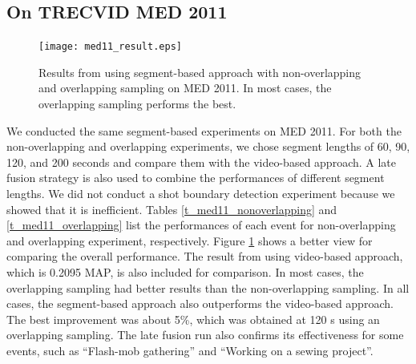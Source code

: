 \subsection{On TRECVID MED 2011}

\begin{figure}
	\centering
	\texttt{[image: med11\_result.eps]}
	\caption{Results from using segment-based approach with non-overlapping and overlapping sampling on MED 2011. In most cases, the overlapping sampling performs the best.}
	\label{f_med11_result}
\end{figure}

We conducted the same segment-based experiments on MED 2011. For both the non-overlapping and overlapping experiments, we chose segment lengths of 60, 90, 120, and 200 seconds and compare them with the video-based approach. A late fusion strategy is also used to combine the performances of different segment lengths. We did not conduct a shot boundary detection experiment because we showed that it is inefficient. Tables \ref{t_med11_nonoverlapping} and \ref{t_med11_overlapping} list the performances of each event for non-overlapping and overlapping experiment, respectively. Figure \ref{f_med11_result} shows a better view for comparing the overall performance. The result from using video-based approach, which is 0.2095 MAP, is also included for comparison. In most cases, the overlapping sampling had better results than the non-overlapping sampling. In all cases, the segment-based approach also outperforms the video-based approach. The best improvement was about 5\%, which was obtained at 120 s using an overlapping sampling. The late fusion run also confirms its effectiveness for some events, such as ``Flash-mob gathering'' and ``Working on a sewing project''.

